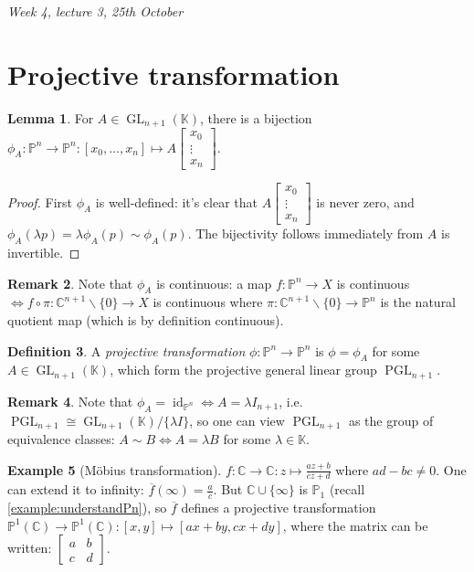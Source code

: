 \documentclass{article}
\newcommand{\C}{\mathbb{C}}
\newcommand{\K}{\mathbb{K}}
\newcommand{\p}{\mathbb{P}}
\newcommand{\id}{\operatorname{id}}
\newcommand{\GL}{\operatorname{GL}}
\newcommand{\PGL}{\operatorname{PGL}}
\theoremstyle{definition}
\newtheorem{defn}{Definition}[subsection]
\newtheorem{lemma}[defn]{Lemma}
\newtheorem{example}[defn]{Example}
\newtheorem{remark}[defn]{Remark}
\begin{document}
\begin{flushright}
\textit{Week 4, lecture 3, 25th October}
\end{flushright}

\section{Projective transformation}
\begin{lemma}
For $A\in\GL_{n+1}(\K)$, there is a bijection $\phi_A:\p^n\rightarrow\p^n:[x_0,\ldots,x_n]\mapsto A\begin{bmatrix}x_0\\ \vdots \\ x_n\end{bmatrix}$.
\end{lemma}
\begin{proof}
First $\phi_A$ is well-defined: it's clear that $A\begin{bmatrix}x_0\\ \vdots \\ x_n\end{bmatrix}$ is never zero, and $\phi_A(\lambda p)=\lambda \phi_A(p)\sim\phi_A(p)$. The bijectivity follows immediately from $A$ is invertible.
\end{proof}
\begin{remark}
Note that $\phi_A$ is continuous: a map $f:\p^n\rightarrow X$ is continuous $\iff f\circ\pi:\C^{n+1}\backslash\{0\}\rightarrow X$ is continuous where $\pi:\C^{n+1}\backslash\{0\}\rightarrow\p^n$ is the natural quotient map (which is by definition continuous).
\end{remark}

\begin{defn}
A \textit{projective transformation} $\phi:\p^n\rightarrow\p^n$ is $\phi=\phi_A$ for some $A\in\GL_{n+1}(\K)$, which form the projective general linear group $\PGL_{n+1}$.
\end{defn}
\begin{remark}
Note that $\phi_A=\id_{\p^n}\iff A=\lambda I_{n+1}$, i.e. $\PGL_{n+1}\cong\GL_{n+1}(\K)/\{\lambda I\}$, so one can view $\PGL_{n+1}$ as the group of equivalence classes: $A\sim B\iff A=\lambda B$ for some $\lambda\in\K$.
\end{remark}

\begin{example}[Möbius transformation]
$f:\C\rightarrow\C:z\mapsto\frac{az+b}{cz+d}$ where $ad-bc\neq 0$. One can extend it to infinity: $\overline f(\infty)=\frac{a}{c}$. But $\C\cup\{\infty\}$ is $\p_1$ (recall \ref{example:understandPn}), so $\overline f$ defines a projective transformation $\p^1(\C)\rightarrow\p^1(\C):[x,y]\mapsto\left[ax+by,cx+dy\right]$, where the matrix can be written: $\begin{bmatrix}a&b\\c&d\end{bmatrix}$.
\end{example}
\end{document}
